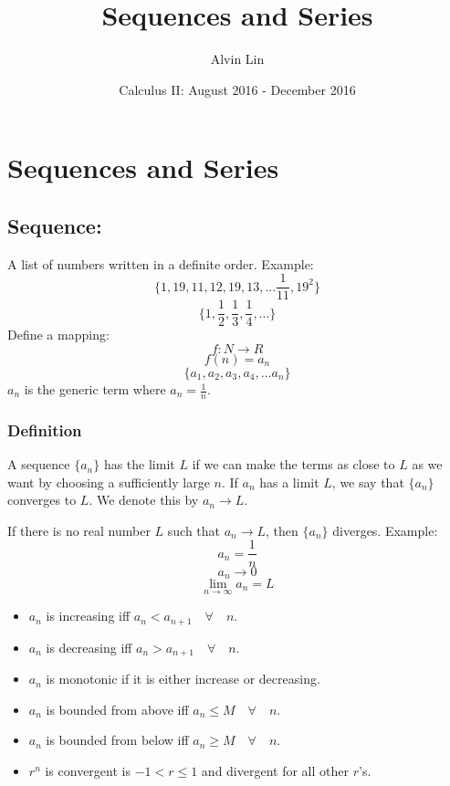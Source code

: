 \documentclass[letterpaper, 12pt]{article}
\title{Sequences and Series}
\author{Alvin Lin}
\date{Calculus II: August 2016 - December 2016}
\begin{document}
\maketitle

\section*{Sequences and Series}

\subsection*{Sequence:}
A list of numbers written in a definite order. Example:
\[ \bigg\{1,19,11,12,19,13,...\frac{1}{11},19^{2}\bigg\} \]
\[ \bigg\{1,\frac{1}{2},\frac{1}{3},\frac{1}{4},...\bigg\} \]
Define a mapping:
\[ f:N \rightarrow R \]
\[ f(n) = a_{n} \]
\[ \bigg\{a_{1},a_{2},a_{3},a_{4},...a_{n}\bigg\} \]
\( a_{n} \) is the generic term where \( a_{n} = \frac{1}{n} \).

\subsubsection*{Definition}
A sequence \( \{a_{n}\} \) has the limit \( L \) if we can make the terms
as close to \( L \) as we want by choosing a sufficiently large \( n \). If
\( a_{n} \) has a limit \( L \), we say that \( \{a_{n}\} \) converges to
\( L \). We denote this by \( a_{n} \rightarrow L \). \par
If there is no real number \( L \) such that \( a_{n} \rightarrow L \),
then \( \{a_{n}\} \) diverges.
\newline
Example:
\[ a_{n} = \frac{1}{n} \]
\[ a_{n} \to 0 \]
\[ \lim_{n \to \infty}{a_{n}} = L \]
\begin{itemize}
  \item \( a_{n} \) is increasing iff
    \( a_{n}<a_{n+1} \quad \forall \quad n \).
  \item \( a_{n} \) is decreasing iff
    \( a_{n}>a_{n+1} \quad \forall \quad n \).
  \item \( a_{n} \) is monotonic if it is either increase or decreasing.
  \item \( a_{n} \) is bounded from above iff
    \( a_{n} \leq M \quad \forall \quad n \).
  \item \( a_{n} \) is bounded from below iff
    \( a_{n} \geq M \quad \forall \quad n \).
  \item \( r^{n} \) is convergent is \( -1 < r \leq 1 \) and divergent
    for all other \( r \)'s.
\end{itemize}
\end{document}
